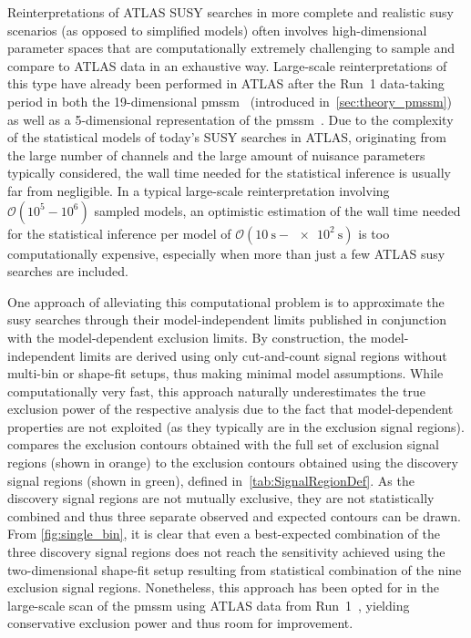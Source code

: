 Reinterpretations of ATLAS SUSY searches in more complete and realistic \gls{susy} scenarios (as opposed to simplified models) often involves high-dimensional parameter spaces that are computationally extremely challenging to sample and compare to ATLAS data in an exhaustive way. Large-scale reinterpretations of this type have already been performed in ATLAS after the Run~1 data-taking period in both the 19-dimensional \gls{pmssm}~\cite{SUSY-2014-08} (introduced in~\cref{sec:theory_pmssm}) as well as a 5-dimensional representation of the \gls{pmssm}~\cite{Aaboud:2016wna}. Due to the complexity of the statistical models of today's SUSY searches in ATLAS, originating from the large number of channels and the large amount of nuisance parameters typically considered, the wall time needed for the statistical inference is usually far from negligible. In a typical large-scale reinterpretation involving $\mathcal{O}(10^5-10^6)$ sampled models, an optimistic estimation of the wall time needed for the statistical inference per model of $\mathcal{O}(\SI{10}{\second}-\SI{e2}{\second})$ is too computationally expensive, especially when more than just a few ATLAS \gls{susy} searches are included.

One approach of alleviating this computational problem is to approximate the \gls{susy} searches through their model-independent limits published in conjunction with the model-dependent exclusion limits. By construction, the model-independent limits are derived using only cut-and-count signal regions without multi-bin or shape-fit setups, thus making minimal model assumptions. While computationally very fast, this approach naturally underestimates the true exclusion power of the respective analysis due to the fact that model-dependent properties are not exploited (as they typically are in the exclusion signal regions).  compares the exclusion contours obtained with the full set of exclusion signal regions (shown in orange) to the exclusion contours obtained using the discovery signal regions (shown in green), defined in~\cref{tab:SignalRegionDef}. As the discovery signal regions are not mutually exclusive, they are not statistically combined and thus three separate observed and expected contours can be drawn. From \cref{fig:single_bin}, it is clear that even a best-expected combination of the three discovery signal regions does not reach the sensitivity achieved using the two-dimensional shape-fit setup resulting from statistical combination of the nine exclusion signal regions. Nonetheless, this approach has been opted for in the large-scale scan of the \gls{pmssm} using ATLAS data from Run~1~\cite{SUSY-2014-08}, yielding conservative exclusion power and thus room for improvement.

